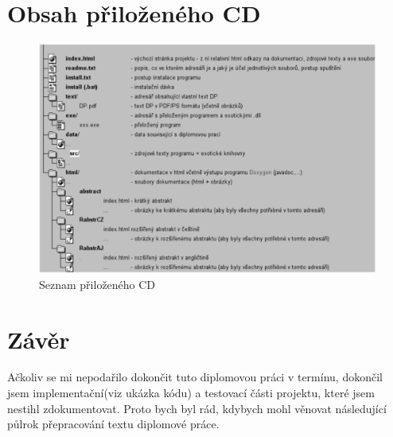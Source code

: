 \documentclass[11pt,twoside,a4paper]{book}
\begin{document}

\chapter{Obsah přiloženého CD}


\begin{figure}[h]
\begin{center}
\includegraphics[width=14cm]{figures/seznamcd}
\caption{Seznam přiloženého CD}
\label{fig:seznamcd}
\end{center}
\end{figure}

\chapter{Závěr}
Ačkoliv se mi nepodařilo dokončit tuto diplomovou práci v termínu, dokončil jsem
implementační(viz ukázka kódu) a testovací části projektu, které jsem nestihl
zdokumentovat. Proto bych byl rád, kdybych mohl věnovat následující půlrok
přepracování textu diplomové práce.
\end{document}
